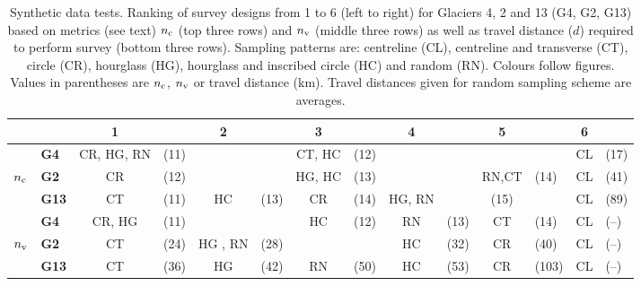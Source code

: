 \documentclass[twocolumn,letterpaper]{igs}
\begin{document}
\begin{table}[]
\centering
\caption{Synthetic data tests. Ranking of survey designs from 1 to 6 (left to right) for Glaciers 4, 2 and 13 (G4, G2, G13) based on metrics (see text) $n_{\rm c}$ (top three rows) and $n_{\rm v}$ (middle three rows) as well as travel distance ($d$) required to perform survey (bottom three rows). Sampling patterns are: centreline (CL), centreline and transverse (CT), circle (CR), hourglass (HG), hourglass and inscribed circle (HC) and random (RN). Colours follow figures. Values in parentheses are $n_{\rm c}$, $n_{\rm v}$ or travel distance (km). Travel distances given for random sampling scheme are averages.}
\label{tab:SynthPatternRanks}
\begin{tabular}{clclclclclclcl}
\hline
          && \textbf{1} && \textbf{2} && \textbf{3} && \textbf{4} && \textbf{5} && \textbf{6} \\
 \hline
                & \textbf{G4}    & \textcolor{CR}{CR}, \textcolor{HG}{HG}, \textcolor{RN}{RN}         & (11)         &          &         &  \textcolor{CT}{CT}, \textcolor{HC}{HC}         & (12)         &          &           &          &  & \textcolor{CL}{CL} & (17) \\
$n_{\rm c}$         & \textbf{G2}   & \textcolor{CR}{CR}         & (12)         &          &           &  \textcolor{HG}{HG}, \textcolor{HC}{HC}         & (13)         &          &          & \textcolor{RN}{RN},\textcolor{CT}{CT}         & (14) & \textcolor{CL}{CL} & (41) \\
                & \textbf{G13} & \textcolor{CT}{CT}         & (11)         & \textcolor{HC}{HC} & (13)         &   \textcolor{CR}{CR}               & (14)         &    \textcolor{HG}{HG}, \textcolor{RN}{RN}                &                  & (15) &  & \textcolor{CL}{CL} & (89) \\
\hline
                & \textbf{G4}   & \textcolor{CR}{CR},  \textcolor{HG}{HG}         & (11)         &         &           & \textcolor{HC}{HC}         & (12)         & \textcolor{RN}{RN}                 & (13)         & \textcolor{CT}{CT} & (14) & \textcolor{CL}{CL} & (--) \\
$n_{\rm v}$         & \textbf{G2}   & \textcolor{CT}{CT}         & (24)         & \textcolor{HG}{HG} ,  \textcolor{RN}{RN}         & (28)    &	 &     & \textcolor{HC}{HC}        & (32)              &  \textcolor{CR}{CR}         & (40) & \textcolor{CL}{CL} & (--) \\
                & \textbf{G13} & \textcolor{CT}{CT}         & (36)         & \textcolor{HG}{HG}         & (42)         & \textcolor{RN}{RN}                 & (50)         &    \textcolor{HC}{HC}      &     (53)     & \textcolor{CR}{CR}         & (103) & \textcolor{CL}{CL} & (--) \\

\end{tabular}
\end{table}
\end{document}
